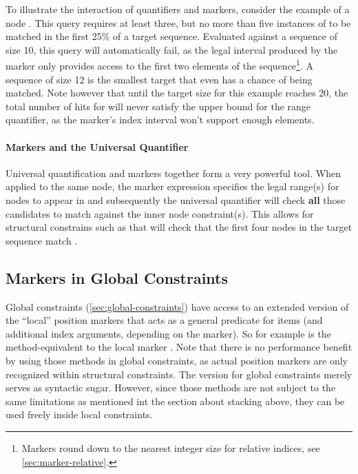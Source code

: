 \documentclass[11pt,a4paper]{report}
\begin{document}
To illustrate the interaction of quantifiers and markers, consider the example of a node .
This query requires at least three, but no more than five instances of  to be matched in the first 25\% of a target sequence.
Evaluated against a sequence of size 10, this query will automatically fail, as the legal interval produced by the marker only provides access to the first two elements of the sequence\footnote{Markers round down to the nearest integer size for relative indices, see \cref{sec:marker-relative}.}.
A sequence of size 12 is the smallest target that even has a chance of being matched.
Note however that until the target size for this example reaches 20, the total number of hits for  will never satisfy the upper bound for the range quantifier, as the marker's index interval won't support enough elements.

\paragraph{Markers and the Universal Quantifier}

\noindent Universal quantification and markers together form a very powerful tool. When applied to the same node, the marker expression specifies the legal range(s) for nodes to appear in and subsequently the universal quantifier will check \textbf{all} those candidates to match against the inner node constraint(s). This allows for structural constrains such as \query{*[\$x: isBefore(5),]} that will check that the first four nodes in the target sequence match .

\subsection{Markers in Global Constraints}
\label{sec:marker-global}
Global constraints (\ref{sec:global-constraints}) have access to an extended version of the ``local'' position markers that acts as a general predicate for items (and additional index arguments, depending on the marker).
So for example  is the method-equivalent to the local marker \query{[\$x: isLast,]}.
Note that there is no performance benefit by using those methods in global constraints, as actual position markers are only recognized within structural constraints.
The version for global constraints merely serves as syntactic sugar.
However, since those methods are not subject to the same limitations as mentioned int the section about stacking above, they can be used freely inside local constraints.
\end{document}
